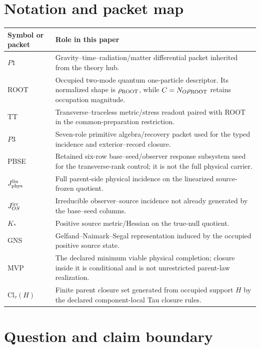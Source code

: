 \documentclass[11pt]{article}
\begin{document}
\section*{Notation and packet map}

\begin{center}
\small
\begin{tabularx}{0.94\textwidth}{@{}p{}>{\raggedright\arraybackslash}X@{}}
\toprule
Symbol or packet & Role in this paper\\
\midrule
$P1$ & Gravity--time--radiation/matter differential packet inherited from the
theory hub.\\
ROOT & Occupied two-mode quantum one-particle descriptor.  Its normalized
shape is $\rho_{\rm ROOT}$, while $C=N_O\rho_{\rm ROOT}$ retains occupation
magnitude.\\
TT & Transverse--traceless metric/stress readout paired with ROOT in the
common-preparation restriction.\\
$P3$ & Seven-role primitive algebra/recovery packet used for the typed
incidence and exterior--record closure.\\
PBSE & Retained six-row base--seed/observer response subsystem used for the
transverse-rank control; it is not the full physical carrier.\\
$J_{\rm phys}^{\rm lin}$ & Full parent-side physical incidence on the
linearized source-frozen quotient.\\
$J_{OS}^{\rm irr}$ & Irreducible observer--source incidence not already
generated by the base--seed columns.\\
$K_*$ & Positive source metric/Hessian on the true-null quotient.\\
GNS & Gelfand--Naimark--Segal representation induced by the occupied positive
source state.\\
MVP & The declared minimum viable physical completion; closure inside it is
conditional and is not unrestricted parent-law realization.\\
$\mathrm{Cl}_\tau(H)$ & Finite parent closure set generated from occupied
support $H$ by the declared component-local Tau closure rules.\\
\bottomrule
\end{tabularx}
\end{center}

\section{Question and claim boundary}
\end{document}
